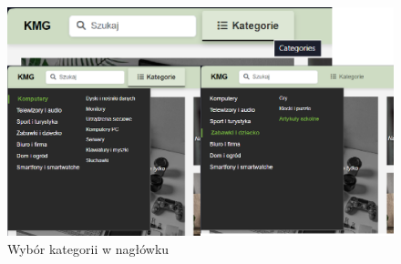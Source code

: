 \documentclass[12pt,a4paper,oneside]{article}
\theoremstyle{definition}
\numberwithin{equation}{section}
\begin{document}
\begin{figure}[H]
    \centering
    \includegraphics[width=0.9\columnwidth]{images/krzysztofBImages/header-categories.png}
    \caption{Wybór kategorii w nagłówku}
    \label{header-categories}
\end{figure}
\end{document}
